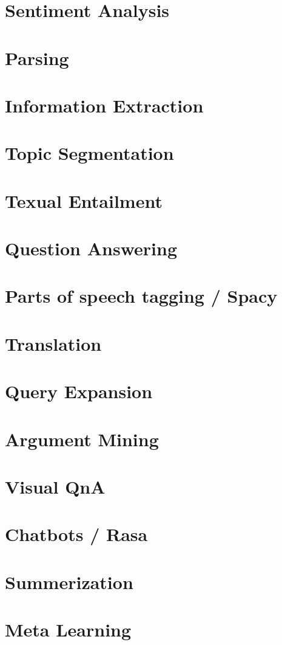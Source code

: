 \documentclass[11pt,fleqn]{book} %
\begin{document}
\chapter{Sentiment Analysis }
\chapter{Parsing}
\chapter{Information Extraction}
\chapter{Topic Segmentation}
\chapter{Texual Entailment}
\chapter{Question Answering}
\chapter{Parts of speech tagging / Spacy}
\chapter{Translation}
\chapter{Query Expansion}
\chapter{Argument Mining}
\chapter{Visual QnA}
\chapter{Chatbots / Rasa}
\chapter{Summerization}
\chapter{Meta Learning}
\end{document}
